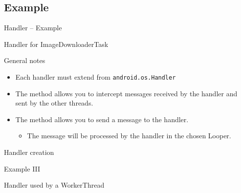 \documentclass{beamer}
\begin{document}
\subsection*{Example}

  \begin{frame}{Handler -- Example} 
    \begin{exampleblock}{Handler for ImageDownloaderTask}
      
    \end{exampleblock}

    \begin{block}{General notes} 
      \begin{itemize}
        \item Each handler must extend from \texttt{android.os.Handler}
        \item The  method allows you to intercept
        messages received by the handler and sent by the other threads.
        \item The  method allows you to send a message to
        the handler.
        \begin{itemize}
          \item The message will be processed by the handler in the chosen
          Looper.
        \end{itemize}
      \end{itemize}
    \end{block}

    \begin{exampleblock}{Handler creation}
      
    \end{exampleblock}
  \end{frame}

  \begin{frame}{Example III}
    \begin{exampleblock}{Handler used by a WorkerThread}
      
    \end{exampleblock}
  \end{frame}
\end{document}
